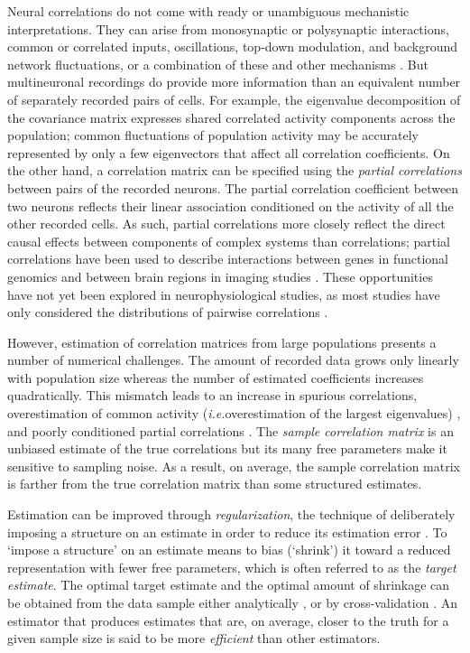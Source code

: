 \documentclass[10pt]{article}
\newcommand{\sq}[1]{\lq#1\rq}
\newcommand{\ie}{\emph{i.e.}\;}
\begin{document}
Neural correlations do not come with ready or unambiguous mechanistic interpretations. They can arise from monosynaptic or polysynaptic interactions, common or correlated inputs, oscillations, top-down modulation, and background network fluctuations, or a combination of these and other mechanisms \cite{Perkel:1967, Moore:1970, Shadlen:1998, Salinas:2001, Ostojic:2009, Rosenbaum:2011}. But multineuronal recordings do provide more information than an equivalent number of separately recorded pairs of cells. For example, the eigenvalue decomposition of the covariance matrix expresses shared correlated activity components across the population; common fluctuations of population activity may be accurately represented by only a few eigenvectors that affect all correlation coefficients. On the other hand, a correlation matrix can be specified using the \emph{partial correlations} between pairs of the recorded neurons. The partial correlation coefficient between two neurons reflects their linear association conditioned on the activity of all the other recorded cells.  As such, partial correlations more closely reflect the direct causal effects between components of complex systems than correlations; partial correlations have been used to describe interactions between genes in functional genomics \cite{Schafer:2005, Peng:2009} and between brain regions in imaging studies \cite{Varoquaux:2012, Ryali:2012}. These opportunities have not yet been explored in neurophysiological studies, as most studies have only considered the distributions of pairwise correlations \cite{Zohary:1994, Bair:2001, Smith:2008, Ecker:2010}. 

However, estimation of correlation matrices from large populations presents a number of numerical challenges. The amount of recorded data grows only linearly with population size whereas the number of estimated coefficients increases quadratically. This mismatch leads to an increase in spurious correlations, overestimation of common activity (\ie overestimation of the largest eigenvalues) \cite{Ledoit:2004}, and poorly conditioned partial correlations \cite{Schafer:2005}. The \emph{sample correlation matrix} is an unbiased estimate of the true correlations but its many free parameters make it sensitive to sampling noise. As a result, on average, the sample correlation matrix is farther from the true correlation matrix than some structured estimates. 

Estimation can be improved through \emph{regularization},  the technique of deliberately imposing a structure on an estimate in order to reduce its estimation error \cite{Schafer:2005, Bickel:2006}. To \sq{impose a structure} on an estimate means to bias (\sq{shrink}) it toward a reduced representation  with fewer free parameters, which is often referred to as the \emph{target estimate}.   The optimal target estimate and the optimal amount of shrinkage can be obtained from the data sample either analytically \cite{Ledoit:2003, Ledoit:2004, Schafer:2005},  or by cross-validation \cite{Friedman:1989}. An estimator that produces estimates that are, on average, closer to the truth for a given sample size is said to be more \emph{efficient} than other estimators.
\end{document}
